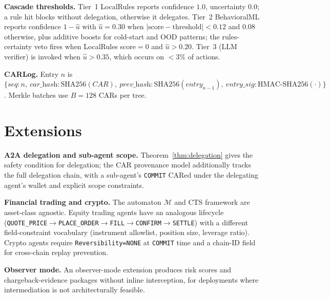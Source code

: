\documentclass{article}
\begin{document}
\textbf{Cascade thresholds.} Tier~1 LocalRules reports confidence $1.0$, uncertainty $0.0$;
a rule hit blocks without delegation, otherwise it delegates. Tier~2 BehavioralML reports
confidence $1-\hat u$ with $\hat u = 0.30$ when $|\text{score}-\text{threshold}|<0.12$ and
$0.08$ otherwise, plus additive boosts for cold-start and OOD patterns; the rules-certainty
veto fires when LocalRules score$=0$ and $\hat u > 0.20$. Tier~3 (LLM verifier) is invoked
when $\hat u > 0.35$, which occurs on $<$3\% of actions.

\textbf{CARLog.} Entry $n$ is
$\{\textit{seq}: n,\ \textit{car\_hash}: \text{SHA256}(\textit{CAR}),\ \textit{prev\_hash}: \text{SHA256}(\textit{entry}_{n-1}),\ \textit{entry\_sig}: \text{HMAC-SHA256}(\cdot)\}$.
Merkle batches use $B{=}128$ CARs per tree.

\section{Extensions}

\textbf{A2A delegation and sub-agent scope.} Theorem~\ref{thm:delegation} gives the safety
condition for delegation; the CAR provenance model additionally tracks the full delegation
chain, with a sub-agent's \texttt{COMMIT} CARed under the delegating agent's wallet and
explicit scope constraints.

\textbf{Financial trading and crypto.} The automaton $\mathcal{M}$ and CTS framework are asset-class agnostic. Equity trading agents have an analogous lifecycle (\texttt{QUOTE\_PRICE}$\to$\texttt{PLACE\_ORDER}$\to$\texttt{FILL}$\to$\texttt{CONFIRM}$\to$\texttt{SETTLE}) with a different field-constraint vocabulary (instrument allowlist, position size, leverage ratio). Crypto agents require \texttt{Reversibility=NONE} at \texttt{COMMIT} time and a chain-ID field for cross-chain replay prevention.

\textbf{Observer mode.} An observer-mode extension produces risk scores and chargeback-evidence packages without inline interception, for deployments where intermediation is not architecturally feasible.


\end{document}
